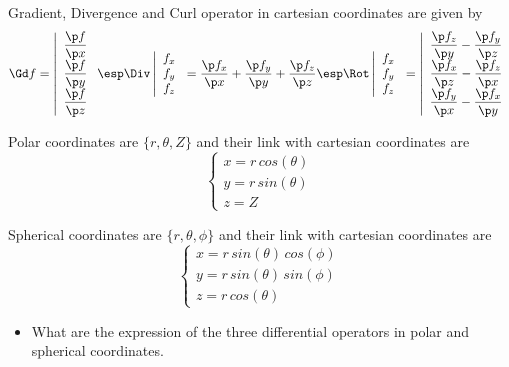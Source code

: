 
\bexo
 Gradient, Divergence and Curl operator in cartesian coordinates are given by 
$$\Gd f=\left|
\begin{array}{c}
\dfrac{\p f}{\p x}\\
\dfrac{\p f}{\p y}\\
\dfrac{\p f}{\p z}
\end{array}
\right. \esp
\Div \left|
\begin{array}{c}
f_x\\
f_y\\
f_z
\end{array}
\right.=\dfrac{\p f_x}{\p x}+
\dfrac{\p f_y}{\p y}
+\dfrac{\p f_z}{\p z}
\esp
\Rot \left|
\begin{array}{c}
f_x\\
f_y\\
f_z
\end{array}\right.=
\left|
\begin{array}{c}
\dfrac{\p f_z}{\p y}-\dfrac{\p f_y}{\p z}\\
\dfrac{\p f_x}{\p z}-\dfrac{\p f_z}{\p x}\\
\dfrac{\p f_y}{\p x}-\dfrac{\p f_x}{\p y}\\
\end{array}
\right.
$$

Polar coordinates are $\{r,\theta,Z\}$ and their link with cartesian coordinates are
$$ \left\{
\begin{array}{c}
x=r\,cos(\theta)\\
y=r\,sin(\theta)\\
z=Z
\end{array}
\right.$$
 
Spherical coordinates are $\{r,\theta,\phi\}$ and their link with cartesian coordinates are
$$ \left\{
\begin{array}{c}
x=r\,sin(\theta)\,cos(\phi)\\
y=r\,sin(\theta)\,sin(\phi)\\
z=r\,cos(\theta)
\end{array}
\right.$$ 
 

\begin{itemize}
\item What are the expression of the three differential operators in polar and spherical coordinates.
\end{itemize} 
\eexo

\solution{}